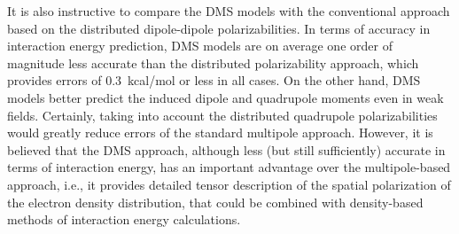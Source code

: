 \documentclass[aip,amsmath,amssymb,reprint,floatfix]{revtex4-1}
\begin{document}
It is also instructive to compare the DMS models with the conventional approach based on the distributed
dipole\hyp{}dipole
polarizabilities. In terms of accuracy in interaction energy prediction, DMS models are on average one order 
of magnitude less accurate than the distributed polarizability approach, which provides errors of 0.3~kcal/mol
or less in all cases. On the other hand, DMS models better predict the induced dipole and quadrupole 
moments even in weak fields. Certainly, taking into account the distributed quadrupole polarizabilities
would greatly reduce errors of the standard multipole approach. However, it is believed that
the DMS approach, although less (but still sufficiently) accurate in terms of interaction energy, 
has an important advantage over the multipole\hyp{}based approach, i.e., it provides detailed
tensor description of the spatial polarization of the electron density distribution, that could be
combined with density\hyp{}based methods of interaction energy calculations.\cite{Mandado.Hermida-Ramon.JCTC.2011}
\end{document}
